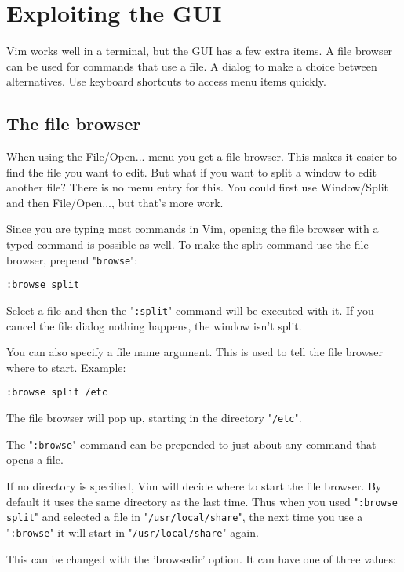 \section{Exploiting the GUI}
Vim works well in a terminal, but the GUI has a few extra items.  A file
browser can be used for commands that use a file.  A dialog to make a choice
between alternatives.  Use keyboard shortcuts to access menu items quickly.
\subsection{The file browser}
When using the File/Open... menu you get a file browser.
This makes it easier to find the file you want to edit.
But what if you want to split a window to edit another file?  There is no menu entry for this.
You could first use Window/Split and then File/Open..., but that's more work.

Since you are typing most commands in Vim, opening the file browser with a typed command is possible as well.
To make the split command use the file browser, prepend "\verb!browse!":

\begin{Verbatim}[samepage=true]
 :browse split
\end{Verbatim}

Select a file and then the "\verb!:split!" command will be executed with it.
If you cancel the file dialog nothing happens, the window isn't split.

You can also specify a file name argument.
This is used to tell the file browser where to start.
Example:

\begin{Verbatim}[samepage=true]
 :browse split /etc
\end{Verbatim}

The file browser will pop up, starting in the directory "\verb!/etc!".

The "\verb!:browse!" command can be prepended to just about any command that opens a file.

If no directory is specified, Vim will decide where to start the file browser.
By default it uses the same directory as the last time.
Thus when you used "\verb!:browse split!" and selected a file in "\verb!/usr/local/share!", the next time you use a "\verb!:browse!" it will start in "\verb!/usr/local/share!" again.

This can be changed with the 'browsedir' option.  It can have one of three values:

